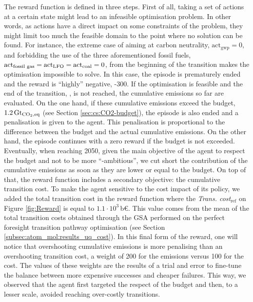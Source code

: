 The reward function is defined in three steps. First of all, taking a set of actions at a certain state might lead to an infeasible optimisation problem. In other words, as actions have a direct impact on some constraints of the problem, they might limit too much the feasible domain to the point where no solution can be found. For instance, the extreme case of aiming at carbon neutrality, \ie $\mathrm{act}_{\mathrm{gwp}}=0$, and forbidding the use of the three aforementioned fossil fuels, \ie $\mathrm{act}\textsubscript{fossil gas}=\mathrm{act}\textsubscript{LFO}=\mathrm{act}\textsubscript{coal}=0$,  from the beginning of the transition makes the optimisation impossible to solve. In this case, the episode is prematurely ended and the reward is ``highly'' negative, -300. If the optimisation is feasible and the end of the transition, , is not reached, the cumulative emissions so far are evaluated. On the one hand, if these cumulative emissions exceed the  budget, $1.2\,\text{Gt}_{\ce{CO2},\text{eq}}$ (see Section \ref{sec:cs:CO2-budget}), the episode is also ended and a penalisation is given to the agent. This penalisation is proportional to the difference between the  budget and the actual cumulative emissions.  On the other hand, the episode continues with a zero reward if the  budget is not exceeded. Eventually, when reaching 2050, given the main objective of the agent to respect the  budget and not to be more ``-ambitious'', we cut short the contribution of the cumulative emissions as soon as they are lower or equal to the  budget.  On top of that, the reward function includes a secondary objective: the cumulative transition cost. To make the agent sensitive to the cost impact of its policy, we added the total transition cost in the reward function where the \emph{Trans. cost$_{\text{ref}}$} on Figure \ref{fig:Reward} is equal to $1.1\cdot10^3$\,b€. This value comes from the mean of the total transition costs obtained through the \gls{GSA} performed on the perfect foresight transition pathway optimisation (see Section \ref{subsec:atom_mol:results_uq_cost}). In this final form of the reward, one will notice that overshooting cumulative emissions is more penalising than an overshooting transition cost, \ie a weight of 200 for the emissions versus 100 for the cost. The values of these weights are the results of a trial and error to fine-tune the balance between more expensive successes and cheaper failures. This way, we observed that the agent first targeted the respect of the  budget and then, to a lesser scale, avoided reaching over-costly transitions.

